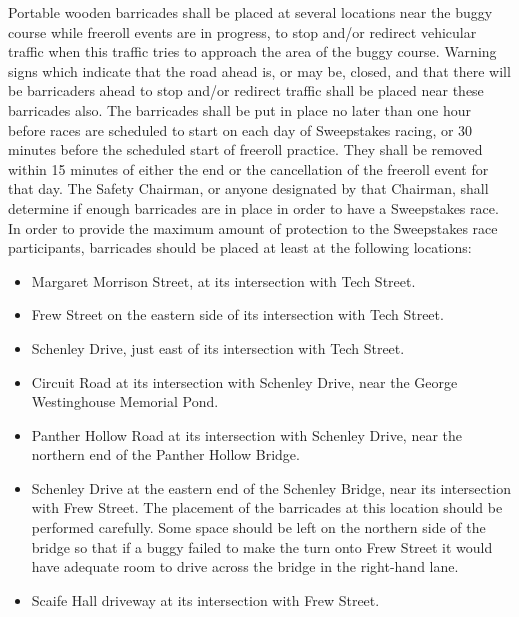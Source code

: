 	Portable wooden barricades shall be placed at several locations near the buggy 
	course while freeroll events are in progress, to stop and/or redirect
	vehicular traffic when this traffic tries to approach the area of the buggy
	course. Warning signs which indicate that the road ahead is, or may be, closed,
	and that there will be barricaders ahead to stop and/or redirect traffic shall be
	placed near these barricades also. The barricades shall be put in place no
	later than one hour before races are scheduled to start on each day of
	Sweepstakes racing, or 30 minutes before the scheduled start of freeroll 
	practice. They shall be removed within 15 minutes of either the end or the 
	cancellation of the freeroll event for that day. The
	Safety Chairman, or anyone designated by that Chairman, shall determine if
	enough barricades are in place in order to have a Sweepstakes race. In order to
	provide the maximum amount of protection to the Sweepstakes race participants,
	barricades should be placed at least at the following locations:

	\begin{itemize}

		\item Margaret Morrison Street, at its intersection with Tech Street.

		\item Frew Street on the eastern side of its intersection with Tech
		Street.

		\item Schenley Drive, just east of its intersection with Tech Street.

		\item Circuit Road at its intersection with Schenley Drive, near the
		George Westinghouse Memorial Pond.

		\item Panther Hollow Road at its intersection with Schenley Drive, near
		the northern end of the Panther Hollow Bridge.

		\item Schenley Drive at the eastern end of the Schenley Bridge, near its
		intersection with Frew Street. The placement of the barricades at this location
		should be performed carefully. Some space should be left on the northern side
		of the bridge so that if a buggy failed to make the turn onto Frew Street it
		would have adequate room to drive across the bridge in the right-hand lane.

		\item Scaife Hall driveway at its intersection with Frew Street.

	\end{itemize}

